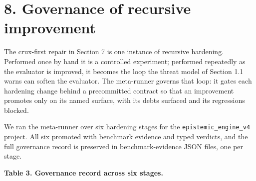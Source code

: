 \documentclass[
  11pt]{article}
\begin{document}
\section{8. Governance of recursive
improvement}\label{governance-of-recursive-improvement}

The crux-first repair in Section 7 is one instance of recursive
hardening. Performed once by hand it is a controlled experiment;
performed repeatedly as the evaluator is improved, it becomes the loop
the threat model of Section 1.1 warns can soften the evaluator. The
meta-runner governs that loop: it gates each hardening change behind a
precommitted contract so that an improvement promotes only on its named
surface, with its debts surfaced and its regressions blocked.

We ran the meta-runner over six hardening stages for the
\texttt{epistemic\_engine\_v4} project. All six promoted with benchmark
evidence and typed verdicts, and the full governance record is preserved
in benchmark-evidence JSON files, one per stage.

\textbf{Table 3. Governance record across six stages.}
\end{document}
